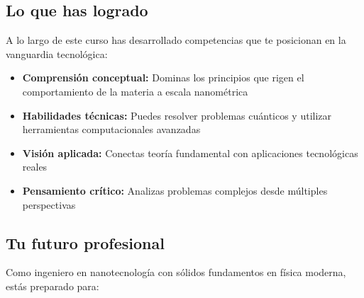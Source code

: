 \begin{tecnologiabox}
\begin{tecnologiabox}
\begin{tecnologiabox}
\subsection{Lo que has logrado}

A lo largo de este curso has desarrollado competencias que te posicionan en la vanguardia tecnológica:

\begin{itemize}
	\item \textbf{Comprensión conceptual:} Dominas los principios que rigen el comportamiento de la materia a escala nanométrica
	\item \textbf{Habilidades técnicas:} Puedes resolver problemas cuánticos y utilizar herramientas computacionales avanzadas
	\item \textbf{Visión aplicada:} Conectas teoría fundamental con aplicaciones tecnológicas reales
	\item \textbf{Pensamiento crítico:} Analizas problemas complejos desde múltiples perspectivas
\end{itemize}

\subsection{Tu futuro profesional}

Como ingeniero en nanotecnología con sólidos fundamentos en física moderna, estás preparado para:

\end{tecnologiabox}
\end{tecnologiabox}
\end{tecnologiabox}
